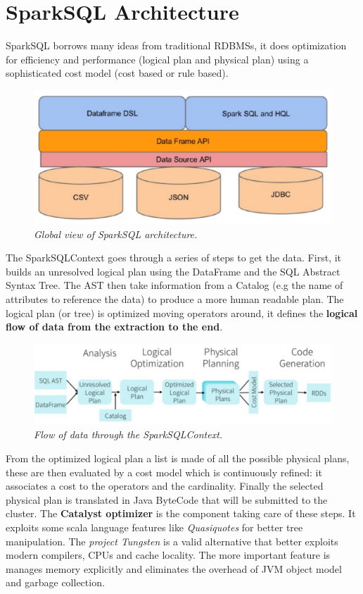 \section{SparkSQL Architecture}
	SparkSQL borrows many ideas from traditional RDBMSs, it does optimization for efficiency and performance (logical plan and physical plan) using a sophisticated cost model (cost based or rule based).
	\begin{figure}[H]
		\centering
		\includegraphics[width=0.8\linewidth]{images/sparksqlarch.png}
		\caption{\textit{Global view of SparkSQL architecture.}}
	\end{figure}
	The SparkSQLContext goes through a series of steps to get the data.\newline
	First, it builds an unresolved logical plan using the DataFrame and the SQL Abstract Syntax Tree. The AST then take information from a Catalog (e.g the name of attributes to reference the data) to produce a more human readable plan.\newline
	The logical plan (or tree) is optimized moving operators around, it defines the \textbf{logical flow of data from the extraction to the end}.\newline
	\begin{figure}[H]
		\centering
		\includegraphics[width=0.8\linewidth]{images/sparksqlcontext.png}
		\caption{\textit{Flow of data through the SparkSQLContext.}}
	\end{figure}
	From the optimized logical plan a list is made of all the possible physical plans, these are then evaluated by a cost model which is continuously refined: it associates a cost to the operators and the cardinality.\newline
	Finally the selected physical plan is translated in Java ByteCode that will be submitted to the cluster.\newline
	\newline
	The \textbf{Catalyst optimizer} is the component taking care of these steps. It exploits some scala language features like \textit{Quasiquotes} for better tree manipulation.\newline
	\newline
	The \textit{project Tungsten} is a valid alternative that better exploits modern compilers, CPUs and cache locality. The more important feature is manages memory explicitly and eliminates the overhead of JVM object model and garbage collection.
	
